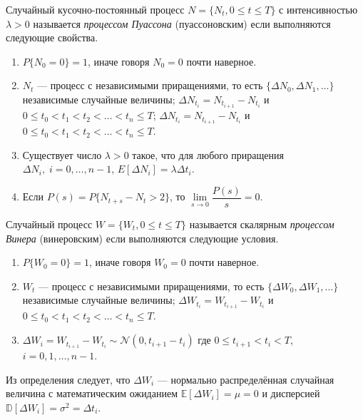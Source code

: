 \documentclass[%
floatfix,
showkeys,
nofootinbib, %
superscriptaddress, %
]{revtex4-1}
\begin{document}
\begin{thedefinition*}
        Случайный кусочно-постоянный процесс $N = \{N_{t}, 0 \leqslant t \leqslant T\}$ с интенсивностью $\lambda > 0$ называется \emph{процессом Пуассона} (пуассоновским) если выполняются следующие свойства.
        \begin{enumerate}
                \item $P\{N_0 = 0\} = 1$, иначе говоря $N_0 = 0$ почти наверное.
                \item $N_t$ --- процесс с независимыми приращениями, то есть $\{\Delta N_{0}, \Delta N_{1}, \ldots\}$ независимые случайные величины; $\Delta N_{t_i} = N_{t_{i+1}} - N_{t_{i}}$ и $0 \leqslant t_{0} < t_{1} < t_{2} < \ldots  < t_{n} \leqslant T$; $\Delta N_{t_i} = N_{t_{i+1}} - N_{t_{i}}$ и $0 \leqslant t_{0} < t_{1} < t_{2} < \ldots  < t_{n} \leqslant T$.
                \item Существует число $\lambda > 0$ такое, что для любого приращения $\Delta N_{i},\; i = 0, \ldots, n-1$, $ E[\Delta N_{i}]= \lambda \Delta t_{i}$.
                \item Если $P(s) = P\{N_{t+s} - N_{t} > 2\}$, то $\lim\limits_{s\to 0} \dfrac{P(s)}{s} = 0$.
        \end{enumerate}
\end{thedefinition*}


\begin{thedefinition*}
        Случайный процесс $W = \{W_t, 0 \leqslant t \leqslant T\}$ называется скалярным \emph{процессом Винера} (винеровским) если выполняются следующие условия.
        \begin{enumerate}
                \item $P\{W_0 = 0\} = 1$, иначе говоря $W_0 = 0$ почти наверное.
                \item $W_t$ --- процесс с независимыми приращениями, то есть $\{\Delta W_{0}, \Delta W_{1}, \ldots\}$ независимые случайные величины; $\Delta W_{t_i} = W_{t_{i+1}} - W_{t_{i}}$ и $0 \leqslant t_{0} < t_{1} < t_{2} < \ldots  < t_{n} \leqslant T$.
                \item $\Delta W_{i} = W_{t_{i+1}} - W_{t_{i}} \sim \mathcal{N}(0,t_{i+1}-t_{i})$ где $0\leqslant t_{i+1} < t_{i} < T$, $i=0,1,\ldots,n-1$.
        \end{enumerate}
\end{thedefinition*}
Из определения следует, что $\Delta W_{i}$ --- нормально
распределённая случайная величина с математическим ожиданием
$\mathbb{E}[\Delta W_{i}] = \mu = 0$ и дисперсией
$\mathbb{D}[\Delta W_{i}] = \sigma^{2} = \Delta t_{i}$.
\end{document}
